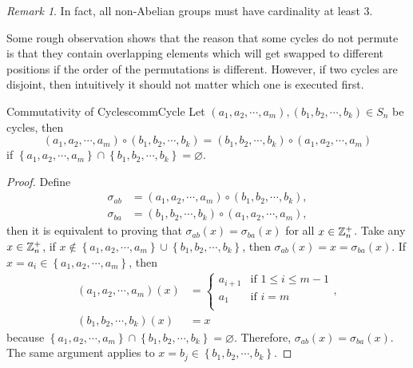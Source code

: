 \documentclass[math]{amznotes}
\theoremstyle{remark}
\newtheorem*{remark}{Remark}
\newcommand{\0}{\mathbf{0}}
\newcommand{\1}{\mathbf{1}}
\begin{document}
\begin{notebox}
    \begin{remark}
        In fact, all non-Abelian groups must have cardinality at least $3$.
    \end{remark}
\end{notebox}
Some rough observation shows that the reason that some cycles do not permute is that they contain overlapping elements which will get swapped to different positions if the order of the permutations is different. However, if two cycles are disjoint, then intuitively it should not matter which one is executed first.
\begin{probox}{Commutativity of Cycles}{commCycle}
    Let $\left(a_1, a_2, \cdots, a_m\right), \left(b_1, b_2, \cdots, b_k\right) \in S_n$ be cycles, then 
    \begin{equation*}
        \left(a_1, a_2, \cdots, a_m\right) \circ \left(b_1, b_2, \cdots, b_k\right) = \left(b_1, b_2, \cdots, b_k\right) \circ \left(a_1, a_2, \cdots, a_m\right)
    \end{equation*}
    if $\left\{a_1, a_2, \cdots, a_m\right\} \cap \left\{b_1, b_2, \cdots, b_k\right\} = \varnothing$.
    \tcblower
    \begin{proof}
        Define 
        \begin{align*}
            \sigma_{ab} & = \left(a_1, a_2, \cdots, a_m\right) \circ \left(b_1, b_2, \cdots, b_k\right), \\
            \sigma_{ba} & = \left(b_1, b_2, \cdots, b_k\right) \circ \left(a_1, a_2, \cdots, a_m\right),
        \end{align*}
        then it is equivalent to proving that $\sigma_{ab}\left(x\right) = \sigma_{ba}\left(x\right)$ for all $x \in \mathbb{Z}_n^+$. Take any $x \in \mathbb{Z}_n^+$, if $x \notin \left\{a_1, a_2, \cdots, a_m\right\} \cup \left\{b_1, b_2, \cdots, b_k\right\}$, then $\sigma_{ab}\left(x\right) = x = \sigma_{ba}\left(x\right)$. If $x = a_i \in \left\{a_1, a_2, \cdots, a_m\right\}$, then 
        \begin{align*}
            \left(a_1, a_2, \cdots, a_m\right)\left(x\right) & = \begin{cases}
                a_{i + 1} & \textrm{if } 1 \leq i \leq m - 1 \\
                a_1 & \textrm{if } i = m \\
            \end{cases}, \\
            \left(b_1, b_2, \cdots, b_k\right)\left(x\right) & = x
        \end{align*}
        because $\left\{a_1, a_2, \cdots, a_m\right\} \cap \left\{b_1, b_2, \cdots, b_k\right\} = \varnothing$. Therefore, $\sigma_{ab}\left(x\right) = \sigma_{ba}\left(x\right)$. The same argument applies to $x = b_j \in \left\{b_1, b_2, \cdots, b_k\right\}$.
    \end{proof}
\end{probox}
\end{document}
